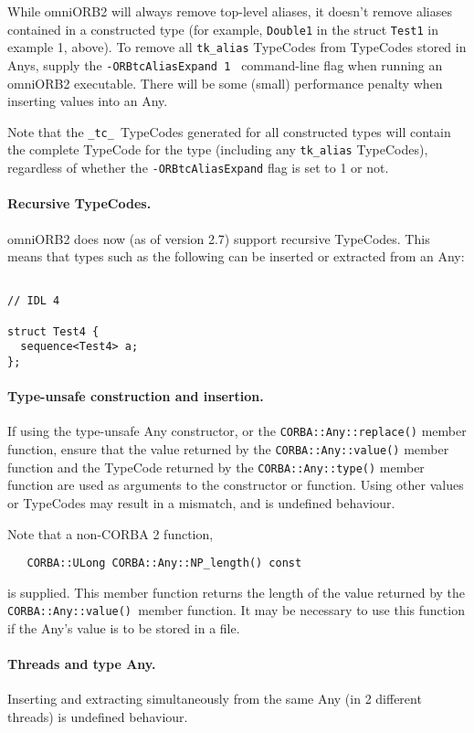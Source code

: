 \documentclass[11pt,twoside,onecolumn]{book}
\begin{document}
While omniORB2 will always remove top-level aliases, it doesn't remove aliases 
contained in a constructed type (for example, {\tt Double1} in the struct 
{\tt Test1} in example 1, above). To remove all {\tt tk\_alias} 
TypeCodes from TypeCodes stored in Anys, supply the {\tt -ORBtcAliasExpand 1 }
command-line flag when running an omniORB2 executable. There will be some 
(small) performance penalty when inserting values into an Any. 

Note that the {\tt \_tc\_ }TypeCodes generated for all constructed types will 
contain the complete TypeCode for the type (including any {\tt tk\_alias} 
TypeCodes), regardless of whether the {\tt -ORBtcAliasExpand} flag is set to 1
or not. 

\paragraph*{Recursive TypeCodes.}
omniORB2 does now (as of version 2.7) support recursive TypeCodes. This
means that types such as the following can be inserted or extracted from
an Any:
{\small
\begin{verbatim}
   
// IDL 4

struct Test4 {
  sequence<Test4> a;
};

\end{verbatim}
}

\paragraph*{Type-unsafe construction and insertion.}
If using the type-unsafe Any constructor, or the {\tt CORBA::Any::replace()} 
member function, ensure that the value returned by the 
{\tt CORBA::Any::value()} member function and the TypeCode returned by the 
{\tt CORBA::Any::type()} member function are used as arguments to the 
constructor or function. Using other values or TypeCodes may result in a 
mismatch, and is undefined behaviour.

Note that a non-CORBA 2 function, 
{\small
\begin{verbatim}
   CORBA::ULong CORBA::Any::NP_length() const
\end{verbatim}
}
is supplied. This member function returns the length of the value returned 
by the {\tt CORBA::Any::value() }member function. It may be necessary to use 
this function if the Any's value is to be stored in a file.

\paragraph*{Threads and type Any.}
Inserting and extracting simultaneously from the same Any (in 2 different 
threads) is undefined behaviour.
\end{document}
